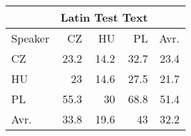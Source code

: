 \begin{tabular}{l|rrr|r}
\hline
 & \multicolumn{3}{c}{Latin Test Text} & \\
\hline
 Speaker   &   CZ &   HU &   PL &   Avr. \\
\hline
 CZ        & 23.2 & 14.2 & 32.7 &   23.4 \\
 HU        & 23   & 14.6 & 27.5 &   21.7 \\
 PL        & 55.3 & 30   & 68.8 &   51.4 \\
\hline
 Avr.     & 33.8 & 19.6 & 43   &   32.2 \\
\hline
\end{tabular}